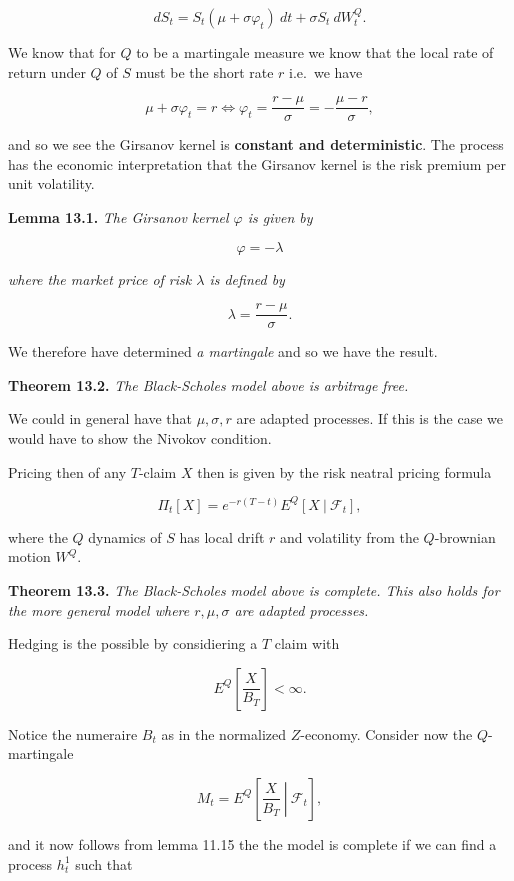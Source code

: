 \documentclass[
]{article}
\begin{document}
\[
dS_t=S_t(\mu + \sigma \varphi_t)\ dt+\sigma S_t\ dW_t^Q.
\]

We know that for \(Q\) to be a martingale measure we know that the local
rate of return under \(Q\) of \(S\) must be the short rate \(r\) i.e.~we
have

\[
\mu + \sigma \varphi_t=r\iff \varphi_t=\frac{r-\mu}{\sigma}=-\frac{\mu -r}{\sigma},\tag{13.3}
\]

and so we see the Girsanov kernel is \textbf{constant and
deterministic}. The process has the economic interpretation that the
Girsanov kernel is the risk premium per unit volatility.

\textbf{Lemma 13.1.} \emph{The Girsanov kernel \(\varphi\) is given by}

\[
\varphi = -\lambda
\]

\emph{where the market price of risk \(\lambda\) is defined by}

\[
\lambda =\frac{r-\mu}{\sigma}.
\]

We therefore have determined \emph{a martingale} and so we have the
result.

\textbf{Theorem 13.2.} \emph{The Black-Scholes model above is arbitrage
free.}

We could in general have that \(\mu,\sigma,r\) are adapted processes. If
this is the case we would have to show the Nivokov condition.

Pricing then of any \(T\)-claim \(X\) then is given by the risk neatral
pricing formula

\[
\Pi_t[X]=e^{-r(T-t)}E^Q[X\ \vert\ \mathcal{F}_t],\tag{13.7}
\]

where the \(Q\) dynamics of \(S\) has local drift \(r\) and volatility
from the \(Q\)-brownian motion \(W^Q\).

\textbf{Theorem 13.3.} \emph{The Black-Scholes model above is complete.
This also holds for the more general model where \(r,\mu,\sigma\) are
adapted processes.}

Hedging is the possible by considiering a \(T\) claim with

\[
E^Q\left[\frac{X}{B_T}\right]<\infty.
\]

Notice the numeraire \(B_t\) as in the normalized \(Z\)-economy.
Consider now the \(Q\)-martingale

\[
M_t=E^Q\left[\left. \frac{X}{B_T}\ \right\vert\ \mathcal{F}_t\right],\tag{13.9}
\]

and it now follows from lemma 11.15 the the model is complete if we can
find a process \(h_t^1\) such that
\end{document}
